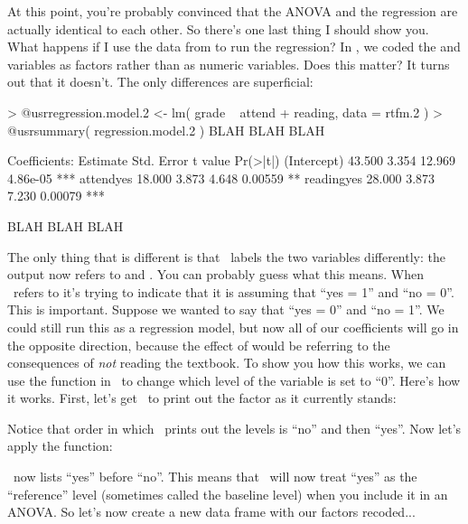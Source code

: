 At this point, you're probably convinced that the ANOVA and the regression are actually identical to each other. So there's one last thing I should show you. What happens if I use the data from  to run the regression? In , we coded the  and  variables as factors rather than as numeric variables. Does this matter? It turns out that it doesn't. The only differences are superficial:
\begin{rblock1}
> @usr{regression.model.2 <- lm( grade ~ attend + reading, data = rtfm.2 )}
> @usr{summary( regression.model.2 )}
BLAH BLAH BLAH

Coefficients:
            Estimate Std. Error t value Pr(>|t|)    
(Intercept)   43.500      3.354  12.969 4.86e-05 ***
attendyes     18.000      3.873   4.648  0.00559 ** 
readingyes    28.000      3.873   7.230  0.00079 ***

BLAH BLAH BLAH
\end{rblock1}
The only thing that is different is that \R\ labels the two variables differently: the output now refers to  and . You can probably guess what this means. When \R\ refers to  it's trying to indicate that it is assuming that ``yes = 1'' and ``no = 0''. This is important. Suppose we wanted to say that ``yes = 0'' and ``no = 1''. We could still run this as a regression model, but now all of our coefficients will go in the opposite direction, because the effect of  would be referring to the consequences of {\it not} reading the textbook. To show you how this works, we can use the  function in \R\ to change which level of the  variable is set to ``0''. Here's how it works. First, let's get \R\ to print out the  factor as it currently stands:
Notice that order in which \R\ prints out the levels is ``no'' and then ``yes''. Now let's apply the  function:
\R\ now lists ``yes'' before ``no''. This means that \R\ will now treat ``yes'' as the ``reference'' level (sometimes called the baseline level) when you include it in an ANOVA. So let's now create a new data frame with our factors recoded...
